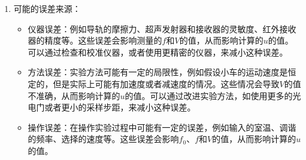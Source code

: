 \documentclass[dvipsnames, svgnames,a4paper,11pt]{article}
\begin{document}
\begin{enumerate}
		接下来计算相对误差：$\eta=\dfrac{u_0-u}{u_0}=1.66\%$。这个结果验证了Doppler效应，也表面声速测量值较好。
		
		\item 可能的误差来源：
		\begin{itemize}
			\item 仪器误差：例如导轨的摩擦力、超声发射器和接收器的灵敏度、红外接收器的精度等。这些误差会影响测量的$f$和$V$的值，从而影响计算的$u$的值。可以通过检查和校准仪器，或者使用更精密的仪器，来减小这种误差。
			\item 方法误差：实验方法可能有一定的局限性，例如假设小车的运动速度是恒定的，但是实际上可能有加速度或者减速度的情况。这些情况会导致$V$的值不准确，从而影响计算的$u$的值。可以通过改进实验方法，如使用更多的光电门或者更小的采样步距，来减小这种误差。
			\item 操作误差：在操作实验过程中可能有一定的误差，例如输入的室温、调谐的频率、选择的速度等。这些误差会影响$f_0$、$f$和$V$的值，从而影响计算的$u$的值。
		\end{itemize}
		
	\end{enumerate}
	
\end{document}

